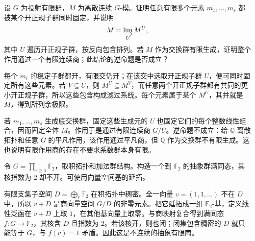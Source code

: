 \begin{exercise}\label{b4:ex:C-no-common-kernel}
	设 \(G\) 为投射有限群，\(M\) 为离散连续 \(G\)-模。证明任意有限多个元素 \(m_1,\ldots,m_s\) 都被某个开正规子群同时固定，并说明
	\[
		M=\varinjlim_U M^U,
	\]
	其中 \(U\) 遍历开正规子群，按反向包含排列。若 \(M\) 作为交换群有限生成，证明整个作用通过一个有限连续商；此结论的逆命题是否成立？
\end{exercise}
\begin{solution}
	每个 \(m_i\) 的稳定子群都开，有限交仍开；在该交中选取开正规子群 \(U\)，便可同时固定所有这些元素。若 \(V\subseteq U\)，则 \(M^U\subseteq M^V\)，而任意两个开正规子群都有共同的更小开正规子群，所以这些包含构成滤过系统。每个元素属于某个 \(M^U\)，其并就是 \(M\)，得到所列余极限。

	若 \(m_1,\ldots,m_s\) 生成底交换群，固定这些生成元的 \(U\) 也固定它们的每个整数线性组合，因而固定全体 \(M\)。作用于是通过有限连续商 \(G/U\)。逆命题不成立：给 \(\mathbb Q\) 离散拓扑和任意 \(G\) 的平凡作用，该作用通过平凡商，但 \(\mathbb Q\) 作为交换群不有限生成。这也说明有限作用商的存在不要求系数群本身有限。
\end{solution}

\begin{exercise}\label{b4:ex:C-discontinuous-finite-quotient}
	令 \(G=\prod_{r\ge1}\mathbb F_2\)，取积拓扑和加法群结构。构造一个到 \(\mathbb F_2\) 的抽象群满同态，其核指数为 \(2\) 却不开。可使用向量空间基的延拓。
\end{exercise}
\begin{solution}
	有限支集子空间 \(D=\bigoplus_r\mathbb F_2\) 在积拓扑中稠密。全一向量 \(v=(1,1,\ldots)\) 不在 \(D\) 中，所以 \(v+D\) 是商向量空间 \(G/D\) 的非零元素。把它延拓成一组 \(\mathbb F_2\)-基，定义线性泛函在 \(v+D\) 上取 \(1\)，在其他基向量上取零。与商映射复合得到满同态 \(f:G\rightarrow\mathbb F_2\)，其核含 \(D\) 且指数为 \(2\)。若该核开，则也闭；闭集包含稠密的 \(D\) 就只能等于 \(G\)，与 \(f(v)=1\) 矛盾。因此这是不连续的抽象有限商。
\end{solution}

